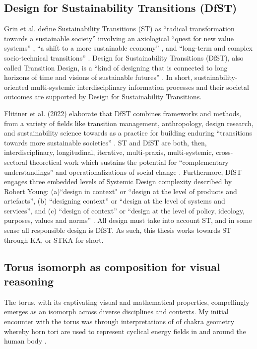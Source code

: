 \subsection{Design for Sustainability Transitions (DfST)}
 Grin et al. define Sustainability Transitions (ST) as “radical transformation towards a sustainable society” \citep[p. 1]{grin_transitions_2011} involving an axiological “quest for new value systems” \citep[p. 2]{grin_transitions_2011}, “a shift to a more sustainable economy” \citep[p. 1]{grin_transitions_2011}, and “long-term and complex socio-technical transitions” \citep[p. 11]{grin_transitions_2011}. Design for Sustainability Transitions (DfST), also called Transition Design, is a “kind of designing that is connected to long horizons of time and visions of sustainable futures” \citep[p. 3]{irwin_transition_2015}. In short, sustainability-oriented multi-systemic interdisciplinary information processes and their societal outcomes are supported by Design for Sustainability Transitions. 

Flittner et al. (2022) elaborate that DfST combines frameworks and methods, from a variety of fields like transition management, anthropology, design research, and sustainability science towards as a practice for building enduring “transitions towards more sustainable societies” \citep[p. 160]{flittner_design_2022}. ST and DfST are both, then, interdisciplinary, longitudinal, iterative, multi-praxis, multi-systemic, cross-sectoral theoretical work which sustains the potential for “complementary understandings” and operationalizations of social change \citep[p. 197]{oztekin_co-positioning_2020} \citep[p. 199]{oztekin_co-positioning_2020}. Furthermore, DfST engages three embedded levels of Systemic Design complexity described by Robert Young: (a)``design in context" or ``design at the level of products and artefacts”, (b) ``designing context” or ``design at the level of systems and services”, and (c) ``design of context” or ``design at the level of policy, ideology, purposes, values and norms” \citep[p. 200]{oztekin_co-positioning_2020} \citep{young_integrated_2008}. All design must take into account ST, and in some sense all responsible design is DfST. As such, this thesis works towards ST through KA, or STKA for short.

\subsection{Torus isomorph as composition for visual reasoning}
The torus, with its captivating visual and mathematical properties, compellingly emerges as an isomorph across diverse disciplines and contexts. My initial encounter with the torus was through interpretations of of chakra geometry whereby horn tori are used to represent cyclical energy fields in and around the human body \citep{singer_quantum_2019}.

